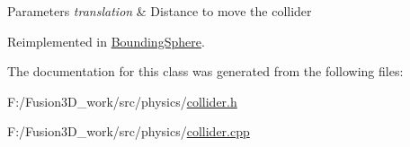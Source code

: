 \begin{DoxyParams}{Parameters}
{\em translation} & Distance to move the collider \\
\hline
\end{DoxyParams}


Reimplemented in \hyperlink{class_bounding_sphere_a272125f529f43fb07ef026afb115ce56}{Bounding\+Sphere}.



The documentation for this class was generated from the following files\+:\begin{DoxyCompactItemize}
\item 
F\+:/\+Fusion3\+D\+\_\+work/src/physics/\hyperlink{collider_8h}{collider.\+h}\item 
F\+:/\+Fusion3\+D\+\_\+work/src/physics/\hyperlink{collider_8cpp}{collider.\+cpp}\end{DoxyCompactItemize}
